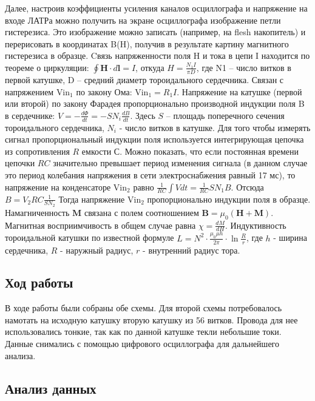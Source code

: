 \documentclass[a4paper,14pt]{extarticle}
\begin{document}
			Далее, настроив коэффициенты усиления каналов осциллографа и напряжение на входе ЛАТРа можно получить на экране осциллографа изображение петли гистерезиса. Это изображение можно записать (например, на flesh накопитель) и перерисовать в координатах B(H), получив в результате картину магнитного гистерезиса в образце. Cвязь напряженности поля H и тока в цепи I находится по теореме о циркуляции: $\oint\limits\mathbf{H}\cdot d\mathbf{l} = I$, откуда $H = \frac{N_1 I}{\pi D}$, где N1 – число витков в первой катушке, D – средний диаметр тороидального сердечника.
			Связан с напряжением $\text{Vin}_1$ по закону Ома: $\text{Vin}_1 = R_1 I$. Напряжение на катушке (первой или второй) по закону Фарадея пропорционально производной индукции поля B в сердечнике: $V = -\frac{d\Phi}{dt} = -SN_i\frac{dB}{dt}$. Здесь $S$ – площадь поперечного сечения тороидального сердечника, $N_i$ - число витков в катушке. Для того чтобы	измерять сигнал пропорциональный индукции поля используется интегрирующая цепочка из сопротивления $R$ емкости $С$. Можно показать, что если постоянная времени цепочки $RC$ значительно превышает период изменения сигнала (в данном случае это период колебания напряжения в сети электроснабжения равный 17 мс), то напряжение на конденсаторе $\text{Vin}_2$	равно $\frac{1}{RC}\int V dt = \frac{1}{RC}S N_1 B$. Отсюда $B = V_2 R C \frac{1}{S N_2}$ Тогда напряжение $\text{Vin}_2$ пропорционально индукции поля в образце. Намагниченность $\mathbf{M}$ связана с полем соотношением $\mathbf{B} =\mu_0(\mathbf{H} + \textbf{M})$. Магнитная восприимчивость в общем случае равна $\chi = \frac{dM}{dH}$. Индуктивность тороидальной катушки по известной формуле $L = N^2 \cdot \frac{\mu_0 \mu h}{2 \pi} \cdot \ln{\frac{R}{r}}$, где $h$ - ширина сердечника, $R$ - наружный радиус, $r$ - внутренний радиус тора.
		\subsection{Ход работы}
			В ходе работы были собраны обе схемы. Для второй схемы потребовалось намотать на исходную катушку вторую катушку из 56 витков. Провода для нее использовались тонкие, так как по данной катушке текли небольшие токи. Данные снимались с помощью цифрового осциллографа для дальнейшего анализа.
		\subsection{Анализ данных}
\end{document}
